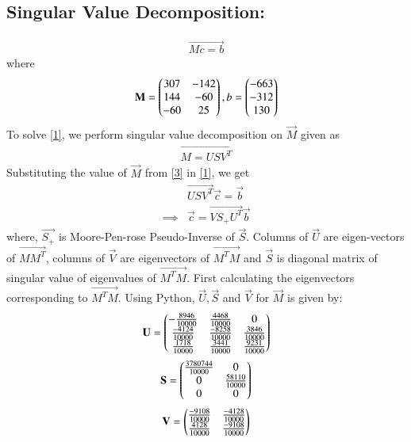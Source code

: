 \begin{enumerate}
\subsection{Singular Value Decomposition:}
\begin{align}
\vec{Mc=b} \label{1}
\end{align}
where
\begin{align}
\mathbf{M} = \begin{pmatrix}307 & -142 \\ 144 & -60 \\ -60 & 25\end{pmatrix},b = \begin{pmatrix}-663 \\-312\\130\end{pmatrix} \label{eq:2}	
\end{align}
To solve \eqref{1}, we perform singular value decomposition on $\vec{M}$ given as 
\begin{align}
	\vec{M = USV^T }\label{3}
\end{align}
Substituting the value of $\vec{M}$ from \eqref{3} in \eqref{1}, we get
\begin{align}
	&\vec{USV^T}\vec{c} = \vec{b} \\
\implies& \vec{c} = \vec{VS_+U^T}\vec{b}\label{eq:4}
\end{align}
where, $\vec{S_+}$ is Moore-Pen-rose Pseudo-Inverse of $\vec{S}$. Columns of $\vec{U}$ are eigen-vectors of $\vec{MM^T}$, columns of $\vec{V}$ are eigenvectors of $\vec{M^TM}$ and $\vec{S}$ is diagonal matrix of singular value of eigenvalues of $\vec{M^TM}$. First calculating the eigenvectors corresponding to $\vec{M^TM}$.\newline
Using Python, $\vec{U}, \vec{S}$ and $\vec{V}$ for $\vec{M}$ is given by: 
\begin{align}
	 \mathbf{U} = \begin{pmatrix}-\frac{8946}{10000} & \frac{4468}{10000} & 0 \\ \frac{-4124}{10000} & \frac{-8258}{10000} & \frac{3846}{10000} \\ \frac{1718}{10000} & \frac{3441}{10000} & \frac{9231}{10000} \end{pmatrix} \label{eq:U}
\end{align}
\begin{align}
	 \mathbf{S} = \begin{pmatrix}\frac{3780744}{10000} & 0 \\ 0 & \frac{58110}{10000}  \\ 0 & 0 \end{pmatrix}
\end{align} \label{eq:S}
\begin{align}
	 \mathbf{V} = \begin{pmatrix}\frac{-9108}{10000} & \frac{-4128}{10000} \\ \frac{4128}{10000} & \frac{-9108}{10000} \end{pmatrix} \label{eq:V}
\end{align}

\end{enumerate}
